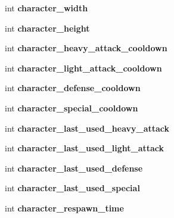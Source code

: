 \begin{DoxyCompactItemize}
\item 
\mbox{\label{classCharacter_a8ede7c049b28ca40d1b35c0e14cc1c66}} 
int {\bfseries character\+\_\+width}
\item 
\mbox{\label{classCharacter_a41926aae9cdfda3730ee7c1a334b0572}} 
int {\bfseries character\+\_\+height}
\item 
\mbox{\label{classCharacter_abf1d7cdaa318adeb9cee6edfe919cb8c}} 
int {\bfseries character\+\_\+heavy\+\_\+attack\+\_\+cooldown}
\item 
\mbox{\label{classCharacter_a7b8e1c9ff525068d6f479b690af1ab09}} 
int {\bfseries character\+\_\+light\+\_\+attack\+\_\+cooldown}
\item 
\mbox{\label{classCharacter_abab76567fdafbc8c185ff5d83d516e76}} 
int {\bfseries character\+\_\+defense\+\_\+cooldown}
\item 
\mbox{\label{classCharacter_a9746df15f2ed60b63577055d0c77b534}} 
int {\bfseries character\+\_\+special\+\_\+cooldown}
\item 
\mbox{\label{classCharacter_a44cde6bc401f387f821d574a31d3bd23}} 
int {\bfseries character\+\_\+last\+\_\+used\+\_\+heavy\+\_\+attack}
\item 
\mbox{\label{classCharacter_a279b7d863c09ae1c6df3aac72db2ca24}} 
int {\bfseries character\+\_\+last\+\_\+used\+\_\+light\+\_\+attack}
\item 
\mbox{\label{classCharacter_aaee6eae1e5b981ddc2bed6823c5cfe68}} 
int {\bfseries character\+\_\+last\+\_\+used\+\_\+defense}
\item 
\mbox{\label{classCharacter_a860b333991b5e12062cfafd164588719}} 
int {\bfseries character\+\_\+last\+\_\+used\+\_\+special}
\item 
\mbox{\label{classCharacter_a87615038725b126168eaf4f47fd60836}} 
int {\bfseries character\+\_\+respawn\+\_\+time}
\item 
\mbox{\label{classCharacter_a3e16e9cb23edc78d774cf30925242a8e}} 

\end{DoxyCompactItemize}
